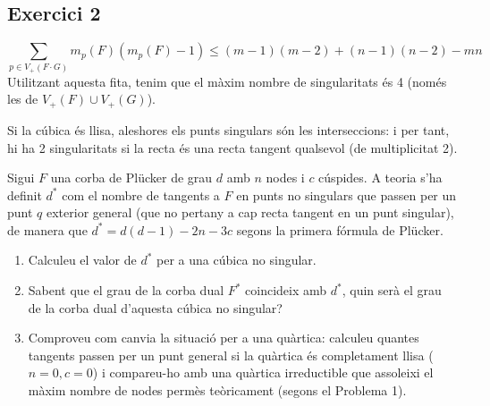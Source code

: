 \documentclass[11pt, a4paper]{article}
\begin{document}
\subsection{Exercici 2}
\[
\sum_{p \in V_+(F\cdot G)} m_p(F)(m_p(F)-1)\le (m-1)(m-2)+(n-1)(n-2)-mn
\]
Utilitzant aquesta fita, tenim que el màxim nombre de singularitats és 4 (només les de $V_+(F)\cup V_+(G)$).\par
Si la cúbica és llisa, aleshores els punts singulars són les interseccions: i per tant, hi ha 2 singularitats si la recta és una recta tangent qualsevol (de multiplicitat 2).
\newpage
\begin{tcolorbox}[title=\section{Exercici 3}]
Sigui $F$ una corba de Plücker de grau $d$ amb $n$ nodes i $c$ cúspides. A teoria s'ha definit $d^*$ com el nombre de tangents a $F$ en punts no singulars que passen per un punt $q$ exterior general (que no pertany a cap recta tangent en un punt singular), de manera que $d^* = d(d-1) - 2n - 3c$ segons la primera fórmula de Plücker.
\begin{enumerate}
    \item Calculeu el valor de $d^*$ per a una cúbica no singular.
    \item Sabent que el grau de la corba dual $F^*$ coincideix amb $d^*$, quin serà el grau de la corba dual d'aquesta cúbica no singular?
    \item Comproveu com canvia la situació per a una quàrtica: calculeu quantes tangents passen per un punt general si la quàrtica és completament llisa ($n=0, c=0$) i compareu-ho amb una quàrtica irreductible que assoleixi el màxim nombre de nodes permès teòricament (segons el Problema 1).
\end{enumerate}
\end{tcolorbox}
\end{document}
